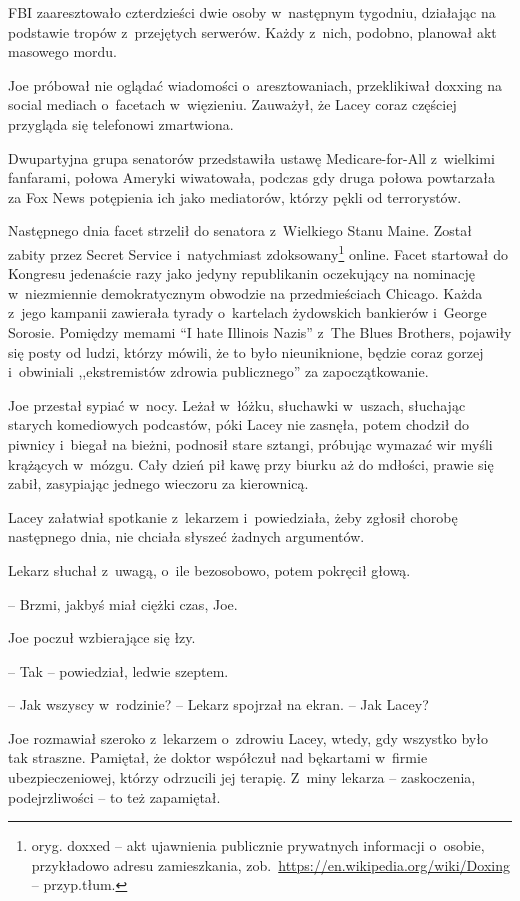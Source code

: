\documentclass[oneside,polish,11pt,sfheadings]{mwbk}
\begin{document}
FBI zaaresztowało czterdzieści dwie osoby w~następnym tygodniu,
działając na podstawie tropów z~przejętych serwerów. Każdy z~nich,
podobno, planował akt masowego mordu.

Joe próbował nie oglądać wiadomości o~aresztowaniach, przeklikiwał
doxxing na social mediach o~facetach w~więzieniu. Zauważył, że Lacey
coraz częściej przygląda się telefonowi zmartwiona.

Dwupartyjna grupa senatorów przedstawiła ustawę Medicare-for-All z~wielkimi fanfarami, połowa Ameryki wiwatowała, podczas gdy druga połowa
powtarzała za Fox News potępienia ich jako mediatorów, którzy pękli od
terrorystów.

Następnego dnia facet strzelił do senatora z~Wielkiego Stanu Maine.
Został zabity przez Secret Service i~natychmiast zdoksowany\footnote{ oryg.
doxxed -- akt ujawnienia publicznie prywatnych informacji o~osobie,
przykładowo adresu zamieszkania,
zob.~\url{https://en.wikipedia.org/wiki/Doxing} -- przyp.tłum.} online. Facet startował do Kongresu jedenaście razy jako
jedyny republikanin oczekujący na nominację w~niezmiennie demokratycznym
obwodzie na przedmieściach Chicago. Każda z~jego kampanii zawierała
tyrady o~kartelach żydowskich bankierów i~George Sorosie. Pomiędzy
memami ``I hate Illinois Nazis'' z~The Blues Brothers, pojawiły się
posty od ludzi, którzy mówili, że to było nieuniknione, będzie coraz
gorzej i~obwiniali ,,ekstremistów zdrowia publicznego'' za
zapoczątkowanie.

Joe przestał sypiać w~nocy. Leżał w~łóżku, słuchawki w~uszach, słuchając
starych komediowych podcastów, póki Lacey nie zasnęła, potem chodził do
piwnicy i~biegał na bieżni, podnosił stare sztangi, próbując wymazać wir
myśli krążących w~mózgu. Cały dzień pił kawę przy biurku aż do mdłości,
prawie się zabił, zasypiając jednego wieczoru za kierownicą.

Lacey załatwiał spotkanie z~lekarzem i~powiedziała, żeby zgłosił chorobę
następnego dnia, nie chciała słyszeć żadnych argumentów.

Lekarz słuchał z~uwagą, o~ile bezosobowo, potem pokręcił głową.

-- Brzmi, jakbyś miał ciężki czas, Joe.

Joe poczuł wzbierające się łzy. 

-- Tak -- powiedział, ledwie szeptem.

-- Jak wszyscy w~rodzinie? -- Lekarz spojrzał na ekran. -- Jak Lacey?

Joe rozmawiał szeroko z~lekarzem o~zdrowiu Lacey, wtedy, gdy wszystko
było tak straszne. Pamiętał, że doktor współczuł nad bękartami w~firmie
ubezpieczeniowej, którzy odrzucili jej terapię. Z~miny lekarza -- zaskoczenia, podejrzliwości -- to też zapamiętał.
\end{document}
